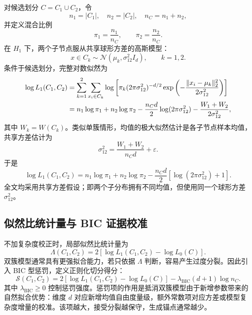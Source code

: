 \documentclass[UTF8,a4paper,12pt,fontset=none]{ctexart}
\newcommand{\epsv}{\varepsilon}
\newcommand{\BIC}{\mathrm{BIC}}
\begin{document}
对候选划分 \(C=C_1\cup C_2\)，令
\[
n_1=|C_1|,\quad n_2=|C_2|,\quad n_C=n_1+n_2,
\]
并定义混合比例
\begin{equation}
\pi_1=\frac{n_1}{n_C},\qquad
\pi_2=\frac{n_2}{n_C}.
\end{equation}
在 \(H_1\) 下，两个子节点服从共享球形方差的高斯模型：
\begin{equation}
x\in C_k\sim \mathcal N(\mu_k,\sigma_{12}^2I_d),
\qquad k=1,2 .
\end{equation}
条件于候选划分，完整对数似然为
\begin{align}
\log L_1(C_1,C_2)
&=
\sum_{k=1}^{2}\sum_{x_i\in C_k}
\log\left[
\pi_k(2\pi\sigma_{12}^2)^{-d/2}
\exp\left(
-\frac{\|x_i-\mu_k\|_2^2}{2\sigma_{12}^2}
\right)
\right]\notag\\
&=
n_1\log\pi_1+n_2\log\pi_2
-\frac{n_Cd}{2}\log(2\pi\sigma_{12}^2)
-\frac{W_1+W_2}{2\sigma_{12}^2},
\end{align}
其中 \(W_k=W(C_k)\)。类似单簇情形，均值的极大似然估计是各子节点样本均值，共享方差估计为
\begin{equation}
\sigma_{12}^2=\frac{W_1+W_2}{n_Cd}+\epsv .
\end{equation}
于是
\begin{equation}
\log L_1(C_1,C_2)
=n_1\log\pi_1+n_2\log\pi_2
-\frac{n_Cd}{2}
\left[\log(2\pi\sigma_{12}^2)+1\right].
\label{eq:loglik_double}
\end{equation}
全文均采用共享方差假设；即两个子分布拥有不同均值，但使用同一个球形方差 \(\sigma_{12}^2\)。

\subsection{似然比统计量与 BIC 证据校准}

不加复杂度校正时，局部似然比统计量为
\begin{equation}
\Lambda(C_1,C_2)
=2\left[\log L_1(C_1,C_2)-\log L_0(C)\right].
\end{equation}
双簇模型通常具有更强拟合能力，若只依据 \(\Lambda\) 判断，容易产生过度分裂。因此引入 BIC 型惩罚，定义正则化切分得分：
\begin{equation}
\mathcal S(C_1,C_2)
=
2\left[\log L_1(C_1,C_2)-\log L_0(C)\right]
-\lambda_{\BIC}(d+1)\log n_C .
\label{eq:bic_lr_score}
\end{equation}
其中 \(\lambda_{\BIC}\ge0\) 控制惩罚强度。惩罚项的作用是抵消双簇模型由于新增参数带来的自然拟合优势：维度 \(d\) 对应新增均值自由度量级，额外常数项对应方差或模型复杂度增量的校准。该项越大，接受分裂越保守，生成锚点通常越少。
\end{document}
